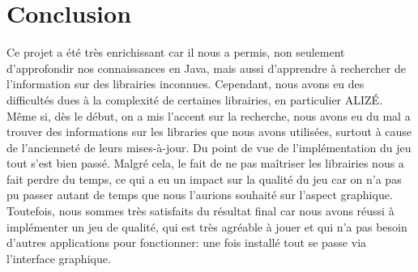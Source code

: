 \section{Conclusion}
\label{sec:conclusion}

Ce projet a été très enrichissant car il nous a permis, non seulement d'approfondir nos connaissances en Java, mais aussi d'apprendre à rechercher de
l'information sur des librairies inconnues. Cependant, nous avons eu des difficultés dues à la complexité de certaines librairies, en particulier ALIZÉ. Même
si, dès le début, on a mis l'accent sur la recherche, nous avons eu du mal a trouver des informations sur les libraries que nous avons utilisées, surtout à
cause de l'ancienneté de leurs mises-à-jour. Du point de vue de l'implémentation du jeu tout s'est bien passé. Malgré cela, le fait de ne pas maîtriser les
librairies nous a fait perdre du temps, ce qui a eu un impact sur  la qualité du jeu car on n'a pas pu passer autant de temps que nous l'aurions souhaité sur
l'aspect graphique. Toutefois, nous sommes très satisfaits du résultat  final car nous avons réussi à implémenter un jeu de qualité, qui est très agréable à
jouer et qui n'a pas besoin d'autres applications pour fonctionner: une fois installé tout se passe via l'interface graphique.

